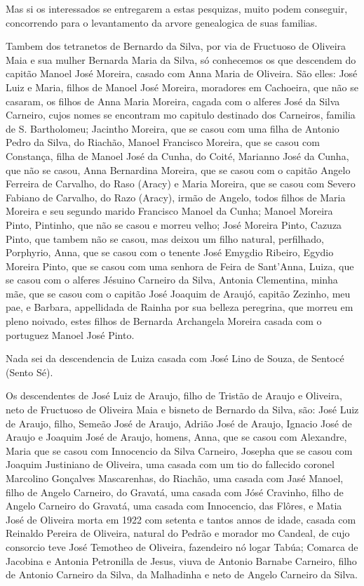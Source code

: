 Mas si os interessados se entregarem a estas pesquizas, muito podem conseguir, concorrendo para o levantamento da arvore genealogica de suas familias.

Tambem dos tetranetos de Bernardo da Silva, por via de Fructuoso de Oliveira Maia e sua mulher Bernarda Maria da Silva, só conhecemos os que descendem do capitão Manoel José Moreira, casado com Anna Maria de Oliveira. São elles: José Luiz e Maria, filhos de Manoel José Moreira, moradores em Cachoeira, que não se casaram, os filhos de Anna Maria Moreira, cagada com o alferes José da Silva Carneiro, cujos nomes se encontram mo capitulo destinado dos Carneiros, familia de S. Bartholomeu; Jacintho Moreira, que se casou com uma filha de Antonio Pedro da Silva, do Riachão, Manoel Francisco Moreira, que se casou com Constança, filha de Manoel José da Cunha, do Coité, Marianno José da Cunha, que não se casou, Anna Bernardina Moreira, que se casou com o capitão Angelo Ferreira de Carvalho, do Raso (Aracy) e Maria Moreira, que se casou com Severo Fabiano de Carvalho, do Razo (Aracy), irmão de Angelo, todos filhos de Maria Moreira e seu segundo marido Francisco Manoel da Cunha; Manoel Moreira Pinto, Pintinho, que não se casou e morreu velho; José Moreira Pinto, Cazuza Pinto, que tambem não se casou, mas deixou um filho natural, perfilhado, Porphyrio, Anna, que se casou com o tenente José Emygdio Ribeiro, Egydio Moreira Pinto, que se casou com uma senhora de Feira de Sant'Anna, Luiza, que se casou com o alferes Jésuino Carneiro da Silva, Antonia Clementina, minha mãe, que se casou com o capitão José Joaquim de Araujó, capitão Zezinho, meu pae, e Barbara, appellidada de Rainha por sua belleza peregrina, que morreu em pleno noivado, estes filhos de Bernarda Archangela Moreira casada com o portuguez Manoel José Pinto.

Nada sei da descendencia de Luiza casada com José Lino de Souza, de Sentocé (Sento Sé).

Os descendentes de José Luiz de Araujo, filho de Tristão de Araujo e Oliveira, neto de Fructuoso de Oliveira Maia e bisneto de Bernardo da Silva, são: José Luiz de Araujo, filho, Semeão José de Araujo, Adrião José de Araujo, Ignacio José de Araujo e Joaquim José de Araujo, homens, Anna, que se casou com Alexandre, Maria que se casou com Innocencio da Silva Carneiro, Josepha que se casou com Joaquim Justiniano de Oliveira, uma casada com um tio do fallecido coronel Marcolino Gonçalves Mascarenhas, do Riachão, uma casada com Jasé Manoel, filho de Angelo Carneiro, do Gravatá, uma casada com Jósé Cravinho, filho de Angelo Carneiro do Gravatá, uma casada com Innocencio, das Flôres, e Matia José de Oliveira morta em 1922 com setenta e tantos annos de idade, casada com Reinaldo Pereira de Oliveira, natural do Pedrão e morador mo Candeal, de cujo consorcio teve José Temotheo de Oliveira, fazendeiro nó logar Tabúa; Comarca de Jacobina e Antonia Petronilla de Jesus, viuva de Antonio Barnabe Carneiro, filho de Antonio Carneiro da Silva, da Malhadinha e neto de Angelo Carneiro da Silva.

